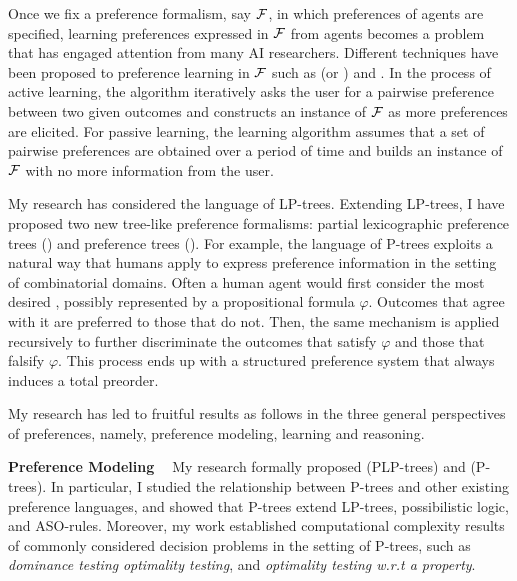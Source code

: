 Once we fix a preference formalism, say $\mathcal{F}$, in which preferences of agents
are specified, learning preferences expressed in $\mathcal{F}$ from agents
becomes a problem that has engaged attention from many AI researchers.
Different techniques have been proposed to preference learning
in $\mathcal{F}$
such as  (or ) and 
\cite{Furnkranz:pref_learning}.
In the process of
active learning, the algorithm iteratively asks the user for a pairwise 
preference between two given outcomes and constructs
an instance of $\mathcal{F}$ as more preferences are elicited.
For passive learning, the learning algorithm assumes that a set of
pairwise preferences are obtained over a period of time and builds an instance
of $\mathcal{F}$ with no more information from the user.

My research has considered the language of LP-trees.
Extending LP-trees, I have proposed two new tree-like preference formalisms:
partial lexicographic preference trees ()\cite{conf/aaai15/LiuT}
and preference trees ()\cite{fraser1994,liu2014preference,conf/adt15/liuT}.
For example, the language of P-trees exploits a natural way that humans apply to
express preference information in the setting of combinatorial domains.
Often a human agent would first consider the most desired ,
possibly represented by a propositional formula $\varphi$.
Outcomes that agree with it are preferred to those that do not.  
Then, the same mechanism is applied recursively to further discriminate the 
outcomes that satisfy $\varphi$ and those that falsify $\varphi$.
This process ends up with a structured preference system that always
induces a total preorder.

My research has led to fruitful results as follows in the three general perspectives
of preferences, namely, preference modeling, learning and reasoning.

\smallskip \noindent \textbf{Preference Modeling \ }
\noindent My research formally proposed 
 (PLP-trees)\cite{conf/aaai15/LiuT} and
 (P-trees)\cite{liu2014preference,conf/adt15/liuT}.
In particular, I studied
the relationship between P-trees and other existing preference languages, and
showed that P-trees extend
LP-trees, possibilistic logic, and ASO-rules.
Moreover, my work established computational complexity results of commonly considered decision
problems in the setting of P-trees, such as \textit{dominance testing} 
\textit{optimality testing}, and
\textit{optimality testing w.r.t a property}.

